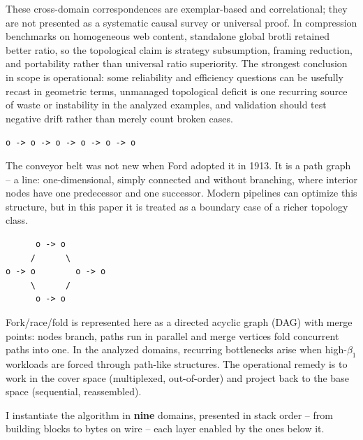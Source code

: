 \documentclass[
  11pt,
]{article}
\begin{document}
These cross-domain correspondences are exemplar-based and correlational;
they are not presented as a systematic causal survey or universal proof.
In compression benchmarks on homogeneous web content, standalone global
brotli retained better ratio, so the topological claim is strategy
subsumption, framing reduction, and portability rather than universal
ratio superiority. The strongest conclusion in scope is operational:
some reliability and efficiency questions can be usefully recast in
geometric terms, unmanaged topological deficit is one recurring source
of waste or instability in the analyzed examples, and validation should
test negative drift rather than merely count broken cases.

\texttt{o\ -\textgreater{}\ o\ -\textgreater{}\ o\ -\textgreater{}\ o\ -\textgreater{}\ o\ -\textgreater{}\ o}

The conveyor belt was not new when Ford adopted it in 1913. It is a path
graph -- a line: one-dimensional, simply connected and without
branching, where interior nodes have one predecessor and one successor.
Modern pipelines can optimize this structure, but in this paper it is
treated as a boundary case of a richer topology class.

\begin{verbatim}
      o -> o
     /      \
o -> o        o -> o
     \      /
      o -> o
\end{verbatim}

Fork/race/fold is represented here as a directed acyclic graph (DAG)
with merge points: nodes branch, paths run in parallel and merge
vertices fold concurrent paths into one. In the analyzed domains,
recurring bottlenecks arise when high-\(\beta_1\) workloads are forced
through path-like structures. The operational remedy is to work in the
cover space (multiplexed, out-of-order) and project back to the base
space (sequential, reassembled).

I instantiate the algorithm in \textbf{nine} domains, presented in stack
order -- from building blocks to bytes on wire -- each layer enabled by
the ones below it.
\end{document}
